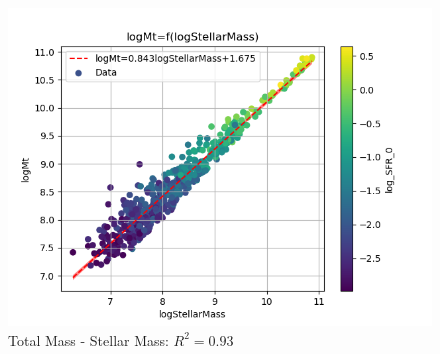 \documentclass[a4paper]{article}
\begin{document}
\begin{figure}[htbp]
\centering
\includegraphics[width=.9\linewidth]{./graphs/logStellarMass-logMt.png}
\caption{\label{Total Mass - Stellar Mass}Total Mass - Stellar Mass: \(R^2=0.93\)}
\end{figure}
\end{document}
